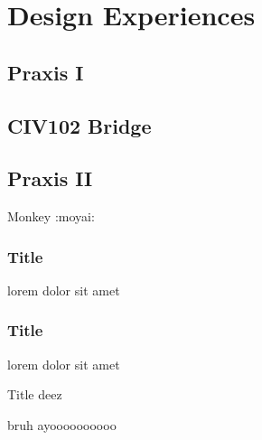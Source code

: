 \documentclass[aspectratio=1610]{beamer}
\begin{document}
\section{Design Experiences}
\subsection{Praxis I}
\subsection{CIV102 Bridge}
\subsection{Praxis II}

{
\begin{frame}{Monkey}
    :moyai:
\end{frame}
}

\begin{frame}
    \frametitle{Title}
    lorem dolor sit amet
\end{frame}

\begin{frame}
    \frametitle{Title}
    lorem dolor sit amet
\end{frame}

\begin{frame}{Title deez}

\end{frame}

\begin{frame}{b}{ruh}
    ayoooooooooo

\end{frame}
\end{document}
